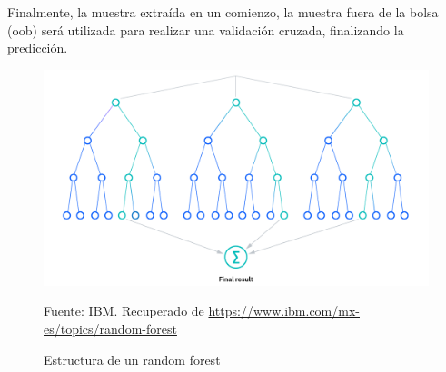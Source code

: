 Finalmente, la muestra extraída en un comienzo, la muestra fuera de la bolsa (oob) será utilizada para realizar una validación cruzada, finalizando la predicción.

\begin{figure}[H]
    \begin{minipage}[t]{0.9\textwidth}
        \caption{Estructura de un random forest}
        \label{random-forest}        
    \end{minipage}

    \vspace{10pt}

    \begin{minipage}[b]{1.1\textwidth}
        \centering
        \includegraphics[width=\textwidth]{img/estructura-random-forest.png}        
    \end{minipage}

    \begin{minipage}[t]{0.9\textwidth}
        Fuente: IBM. Recuperado de \url{https://www.ibm.com/mx-es/topics/random-forest}
    \end{minipage}
\end{figure}

